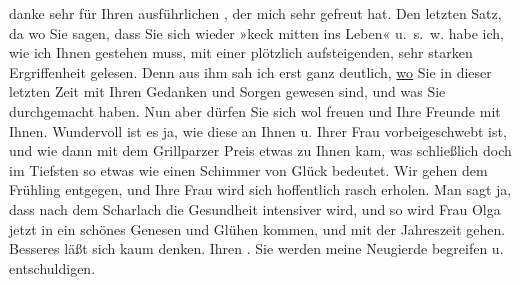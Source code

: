 \begin{ledgroupsized}[t]{13cm}
           danke sehr für Ihren ausführlichen \label{K_L03491-1v}\label{K_L03491-1h}, der mich sehr gefreut hat. Den letzten Satz, da wo Sie sagen, dass Sie sich
               wieder »keck mitten ins Leben« u. s. w. habe ich, wie ich Ihnen gestehen muss, mit
               einer plötzlich aufsteigenden, sehr starken Ergriffenheit gelesen. Denn aus ihm sah
               ich erst ganz deutlich, \uline{wo} Sie in dieser letzten Zeit
               mit Ihren Gedanken und Sorgen gewesen sind, und was Sie durchgemacht haben. Nun aber
               dürfen Sie sich wol freuen und Ihre Freunde mit Ihnen. Wundervoll ist es ja, wie
               diese \label{K_L03491-2v}\label{K_L03491-2h} an Ihnen u. Ihrer Frau vorbeigeschwebt ist, und wie dann mit dem Grillparzer Preis etwas zu Ihnen kam, was schließlich doch im
               Tiefsten so etwas wie einen Schimmer von Glück bedeutet. Wir gehen dem Frühling
               entgegen, und Ihre Frau wird
               sich hoffentlich rasch erholen. Man sagt ja, dass nach dem Scharlach die Gesundheit
               intensiver wird, und so wird Frau Olga jetzt in
               ein schönes Genesen und Glühen kommen, und mit der Jahreszeit gehen. Besseres läßt
               sich kaum denken. Ihren \label{K_L03491-3v}\label{K_L03491-3h}. Sie werden meine Neugierde begreifen u. entschuldigen. \label{K_L03491-4v}
\end{ledgroupsized}
